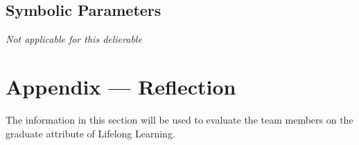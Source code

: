 \documentclass[12pt, titlepage]{article}
\begin{document}
\subsection{Symbolic Parameters}

\textit{Not applicable for this delierable}


\newpage{}
\section*{Appendix --- Reflection}


The information in this section will be used to evaluate the team members on the
graduate attribute of Lifelong Learning.


\end{document}
